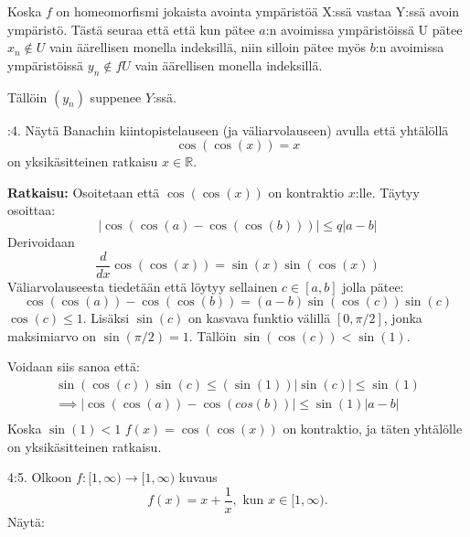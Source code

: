 \documentclass[12pt,a4paper,leqno]{amsart}
\begin{document}
Koska $f$ on homeomorfismi jokaista avointa ympäristöä X:ssä vastaa Y:ssä avoin ympäristö. Tästä seuraa että että kun pätee $a$:n avoimissa ympäristöissä U pätee $x_n \notin U$ vain äärellisen monella indeksillä, niin silloin pätee myös $b$:n avoimissa ympäristöissä $y_n \notin fU$ vain äärellisen monella indeksillä.

Tällöin $(y_n)$ suppenee $Y$:ssä.

\bigskip

:4. Näytä Banachin kiintopistelauseen (ja väliarvolauseen) avulla että yhtälöllä
\[
\cos(\cos(x)) = x
\]
on yksikäsitteinen ratkaisu $x \in \mathbb R$.

\textbf{Ratkaisu: } 
Osoitetaan että $\cos(\cos(x))$ on kontraktio $x$:lle.
Täytyy osoittaa:
\[
|\cos(\cos(a) - \cos(\cos(b)))| \leq q |a - b|
\]
Derivoidaan
\[\frac{d}{dx} \cos(\cos(x)) = \sin(x) \sin(\cos(x))\]
Väliarvolauseesta tiedetään että löytyy sellainen $c \in [a, b]$ jolla pätee:
\[\cos(\cos(a)) - \cos(\cos(b)) = (a - b) \sin(\cos(c)) \sin(c)\]
$\cos(c) \leq 1 $. Lisäksi $\sin(c)$ on kasvava funktio välillä $[0, \pi/2]$, jonka maksimiarvo on $\sin(\pi/2) = 1$. Tällöin $\sin(\cos(c)) < \sin(1)$.

Voidaan siis sanoa että:
\begin{align*}
     \sin(\cos(c)) \sin(c) \leq (\sin(1)) | \sin(c)| \leq \sin(1) \\
     \implies | \cos (\cos(a)) - \cos(cos(b)) | \leq \sin(1)|a-b| \\
\end{align*}
Koska $\sin(1) < 1$ $f(x) = \cos(\cos(x))$ on kontraktio, ja täten yhtälölle on yksikäsitteinen ratkaisu.
\bigskip

4:5. Olkoon $f: [1, \infty)  \to [1, \infty)$ kuvaus 
\[
f(x) = x + \frac{1}{x}, \textrm{ kun } x \in [1, \infty).
\]
Näytä:
\end{document}
